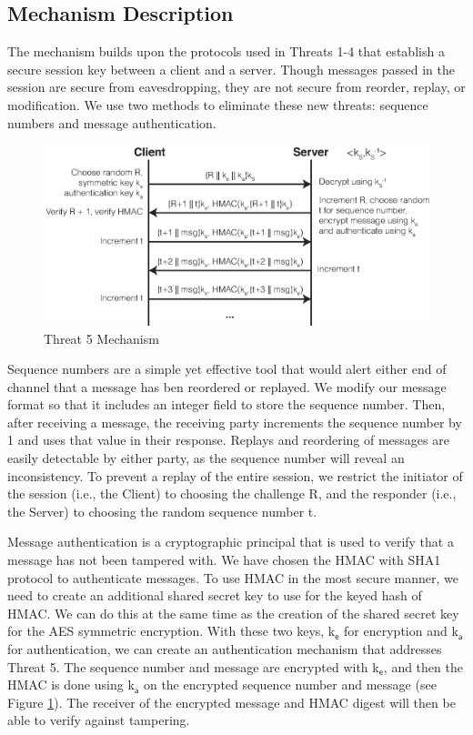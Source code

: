 \documentclass[11pt]{article}
\begin{document}
\subsection{Mechanism Description}
The mechanism builds upon the protocols used in Threats 1-4 that establish a secure session key between a client and a server. Though messages passed in the session are secure from eavesdropping, they are not secure from reorder, replay, or modification. We use two methods to eliminate these new threats: sequence numbers and message authentication.
\begin{figure}[htbp]
\begin{center}
\includegraphics{threat5.eps}
\caption{Threat 5 Mechanism}
\label{threat5}
\end{center}
\end{figure}

Sequence numbers are a simple yet effective tool that would alert either end of channel that a message has ben reordered or replayed. We modify our message format so that it includes an integer field to store the sequence number. Then, after receiving a message, the receiving party increments the sequence number by 1 and uses that value in their response. Replays and reordering of messages are easily detectable by either party, as the sequence number will reveal an inconsistency. To prevent a replay of the entire session, we restrict the initiator of the session (i.e., the Client) to choosing the challenge \textsf{R}, and the responder (i.e., the Server) to choosing the random sequence number \textsf{t}.

Message authentication is a cryptographic principal that is used to verify that a message has not been tampered with. We have chosen the HMAC with SHA1 protocol to authenticate messages. To use HMAC in the most secure manner, we need to create an additional shared secret key to use for the keyed hash of HMAC. We can do this at the same time as the creation of the shared secret key for the AES symmetric encryption. With these two keys, \textsf{k}$_\textsf{e}$ for encryption and \textsf{k}$_\textsf{a}$ for authentication, we can create an authentication mechanism that addresses Threat 5. The sequence number and message are encrypted with \textsf{k}$_\textsf{e}$, and then the HMAC is done using \textsf{k}$_\textsf{a}$ on the encrypted sequence number and message (see Figure \ref{threat5}). The receiver of the encrypted message and HMAC digest will then be able to verify against tampering.
\end{document}

